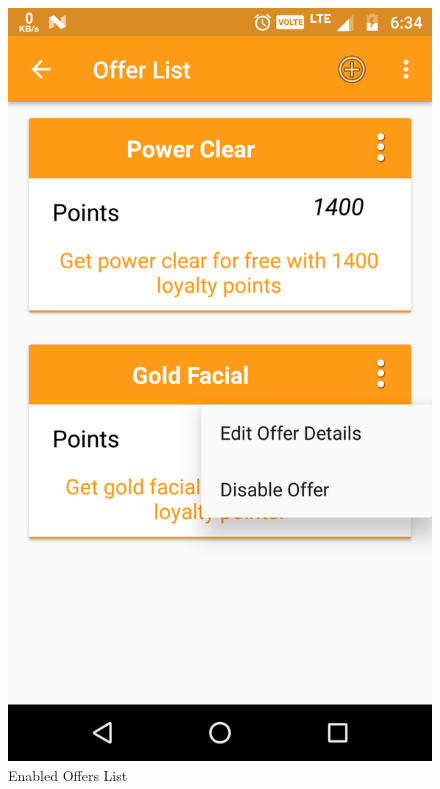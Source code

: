 \\
\begin{figure}[h]
	\centering
	\includegraphics[width=0.7\linewidth]{EnabledOffersList}
	\caption{Enabled Offers List}
\end{figure}
\pagebreak


